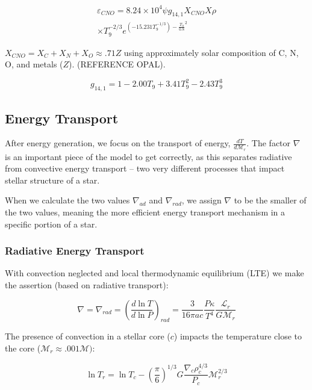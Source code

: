 \documentclass[twocolumn]{aastex631}
\begin{document}
\begin{equation}
\begin{split}
    \label{CNO}
    \varepsilon _{CNO} = 8.24 \times 10^{4} \psi g_{14,1} X_{CNO}X \rho \\
    \times T_9^{-2/3} e^{(-15.231T_9^{-1/3}) - \frac{T_9}{0.8}^2}
\end{split}
\end{equation}

$X_{CNO} = X_C + X_N + X_O \approx .71 Z$ using approximately solar composition of C, N, O, and metals ($Z$). (REFERENCE OPAL).

\begin{equation}
    \label{g14,1}
    g_{14,1} = 1 - 2.00T_9 + 3.41T_9^2 - 2.43T_9^3
\end{equation}

\subsection{Energy Transport}

After energy generation, we focus on the transport of energy, $\frac{d T}{d\mathcal{M}_r}$. The factor $\nabla$ is an important piece of the model to get correctly, as this separates radiative from convective energy transport -- two very different processes that impact stellar structure of a star.

When we calculate the two values $\nabla_{ad}$ and $\nabla_{rad}$, we assign $\nabla$ to be the smaller of the two values, meaning the more efficient energy transport mechanism in a specific portion of a star. 

\subsubsection{Radiative Energy Transport}

With convection neglected and local thermodynamic equilibrium (LTE) we make the assertion (based on radiative transport):

\begin{equation}
	\nabla = \nabla_{rad} = \left(\frac{d \ln{T}}{d \ln{P}}\right)_{rad} = \frac{3}{16\pi ac}\frac{P \kappa}{T^4}\frac{\mathcal{L}_r}{G\mathcal{M}_r}
\end{equation}

The presence of convection in a stellar core ($c$) impacts the temperature close to the core ($\mathcal{M}_r \approx .001\mathcal{M})$:

\begin{equation}
 	\ln{T_r} = \ln{T_c} - \left(\frac{\pi}{6}\right)^{1/3} G \frac{\nabla_c \rho_c^{4/3}}{P_c} \mathcal{M}_r^{2/3}
\end{equation}
\end{document}
